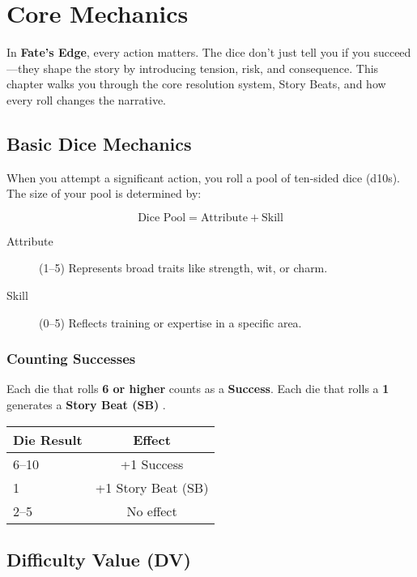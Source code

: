 
\chapter{Core Mechanics}
\label{ch:core-mechanics}

In \textbf{Fate's Edge}, every action matters. The dice don't just tell you if you succeed—they shape the story by introducing tension, risk, and consequence. This chapter walks you through the core resolution system, Story Beats, and how every roll changes the narrative.

\section{Basic Dice Mechanics}

When you attempt a significant action, you roll a pool of ten-sided dice (d10s). The size of your pool is determined by:

\[
\text{Dice Pool} = \text{Attribute} + \text{Skill}
\]

\begin{description}
  \item[Attribute]  (1–5) Represents broad traits like strength, wit, or charm.
  \item[Skill]  (0–5) Reflects training or expertise in a specific area.
\end{description}

\subsection*{Counting Successes}

Each die that rolls \textbf{6 or higher} counts as a \textbf{Success}. Each die that rolls a \textbf{1} generates a \textbf{Story Beat (SB)} .

\begin{center}
\begin{tabular}{lc}
\toprule
\textbf{Die Result} & \textbf{Effect} \\
\midrule
6–10 & +1 Success \\
1 & +1 Story Beat (SB) \\
2–5 & No effect \\
\bottomrule
\end{tabular}
\end{center}

\section{Difficulty Value (DV)}

